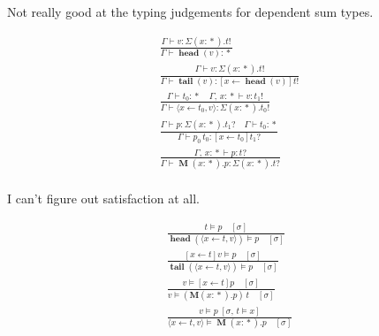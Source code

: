 \documentclass[twocolumn, fleqn]{scrartcl}
\DeclareMathOperator{\prop}{*}
\DeclareMathOperator{\head}{\textbf{head}}
\DeclareMathOperator{\tail}{\textbf{tail}}
\DeclareMathOperator{\Mu}{\textbf{M}}
\DeclareMathOperator{\update}{\leftarrow}
\begin{document}
Not really good at the typing judgements for dependent sum types.

\begin{multline*}
\frac{
  \Gamma \vdash v \colon \Sigma (x \colon \prop). t !
}{
  \Gamma \vdash \head(v) \colon \prop
}\\
\frac{
  \Gamma \vdash v \colon \Sigma (x \colon \prop). t !
}{
  \Gamma \vdash \tail(v) \colon [x \update \head(v)] t !
}\\
\frac{
  \Gamma \vdash t_0 \colon \prop \quad
  \Gamma , \, x \colon \prop \vdash v \colon t_1 !
}{
  \Gamma \vdash \langle x \update t_0 , v \rangle \colon \Sigma (x \colon \prop). t_0 !
}\\
\frac{
  \Gamma \vdash p \colon \Sigma (x\colon \prop). t_1 ? \quad
  \Gamma \vdash t_0 \colon \prop
}{
  \Gamma \vdash p_0 \, t_0 \colon [x \update t_0] t_1 ?
}\\
\frac{
  \Gamma , \, x \colon \prop \vdash p \colon t ?
}{
  \Gamma \vdash \Mu (x \colon \prop). p \colon \Sigma (x\colon \prop). t ?
}\\
\end{multline*}

I can't figure out satisfaction at all.

\begin{multline*}
\frac{
  t \models p \quad [\sigma]
}{
  \head(\langle x \update t , v \rangle) \models p \quad [\sigma]
}\\
\frac{
  [x \update t] v \models p \quad [\sigma]
}{
  \tail(\langle x \update t , v \rangle) \models p \quad [\sigma]
}\\
\frac{
  v \models [x \update t] p \quad [\sigma]
}{
  v \models ( \textbf{M} (x \colon \prop). p) \, t \quad [\sigma]
}\\
\frac{
  v \models p \; [ \sigma , \, t \models x]
}{
  \langle x \update t , v \rangle \models \Mu (x \colon \prop). p \quad [\sigma]
}\\
\end{multline*}
\end{document}
